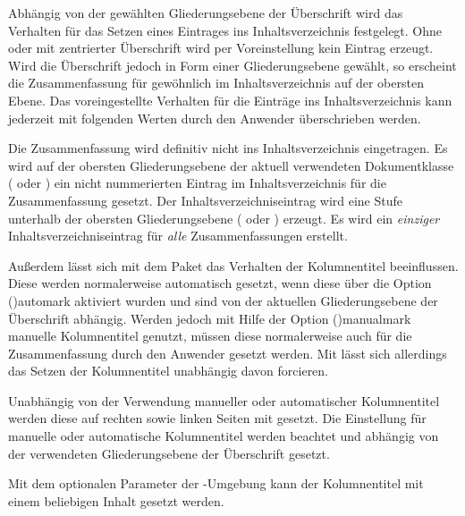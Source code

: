 \begin{DeclareEntity*}{}
\begin{DeclareEntity*}{}
\begin{DeclareEntity*}{}
\begin{Declaration}
Abhängig von der gewählten Gliederungsebene der Überschrift wird das Verhalten 
für das Setzen eines Eintrages ins Inhaltsverzeichnis festgelegt. Ohne oder mit 
zentrierter Überschrift wird per Voreinstellung kein Eintrag erzeugt. Wird die 
Überschrift jedoch in Form einer Gliederungsebene gewählt, so erscheint die 
Zusammenfassung für gewöhnlich im Inhaltsverzeichnis auf der obersten Ebene. 
Das voreingestellte Verhalten für die Einträge ins Inhaltsverzeichnis kann 
jederzeit mit folgenden Werten durch den Anwender überschrieben werden.
%
\begin{DeclareValues}[Inhaltsverzeichnis]{}
  Die Zusammenfassung wird definitiv nicht ins Inhaltsverzeichnis eingetragen.
  Es wird auf der obersten Gliederungsebene der aktuell verwendeten 
  Dokumentklasse ( oder ) ein nicht 
  nummerierten Eintrag im Inhaltsverzeichnis für die Zusammenfassung gesetzt.
  Der Inhaltsverzeichniseintrag wird eine Stufe unterhalb der obersten 
  Gliederungsebene ( oder ) erzeugt.
  Es wird ein \emph{einziger} Inhaltsverzeichniseintrag für \emph{alle} 
  Zusammenfassungen erstellt.
\end{DeclareValues}

%
%
Außerdem lässt sich mit dem Paket  das Verhalten der 
Kolumnentitel beeinflussen. Diese werden normalerweise automatisch gesetzt, 
wenn diese über die Option \Option(){automark} 
aktiviert wurden und sind von der aktuellen Gliederungsebene der Überschrift 
abhängig. Werden jedoch mit Hilfe der Option 
\Option(){manualmark} manuelle Kolumnentitel 
genutzt, müssen diese normalerweise auch für die Zusammenfassung durch den 
Anwender gesetzt werden. Mit  lässt sich allerdings 
das Setzen der Kolumnentitel unabhängig davon forcieren.
%
\begin{DeclareValues}[Kolumnentitel]{}
  Unabhängig von der Verwendung manueller oder automatischer Kolumnentitel 
  werden diese auf rechten sowie linken Seiten mit  gesetzt.
  Die Einstellung für manuelle oder automatische Kolumnentitel werden beachtet 
  und abhängig von der verwendeten Gliederungsebene der Überschrift gesetzt.
\end{DeclareValues}
Mit dem optionalen Parameter  der 
-Umgebung kann der Kolumnentitel mit einem beliebigen 
Inhalt gesetzt werden.


\end{Declaration}
\end{DeclareEntity*}
\end{DeclareEntity*}
\end{DeclareEntity*}
